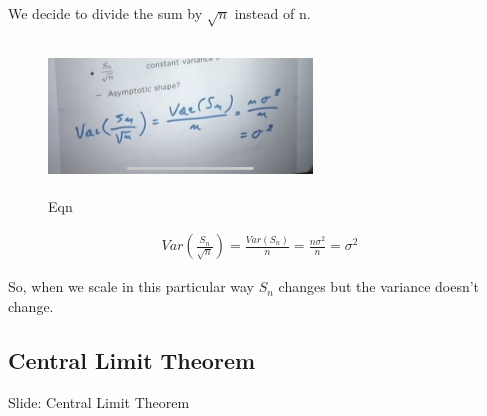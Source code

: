 We decide to divide the sum by $\sqrt{n}$ instead of n.

\begin{figure}[ht]
\centering
\includegraphics[width=7cm, height=4cm]{images/L19/IMG_3320.jpeg}
\caption{Eqn}
\end{figure}

\begin{align}
    Var(\frac{S_n}{\sqrt{n}})=\frac{Var(S_n)}{n} = \frac{n \sigma^2}{n} = \sigma^2
\end{align}

So, when we scale in this particular way $S_n$ changes but the variance doesn't change.

\subsection{Central Limit Theorem}


Slide: Central Limit Theorem\\


